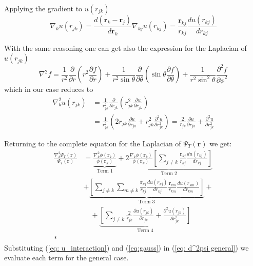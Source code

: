 Applying the gradient to $u(r_{jk})$
\begin{equation*}
    \nabla_k u(r_{jk}) = \frac{ d (\mathbf{r}_k - \mathbf{r}_j)}{d \mathbf{r}_k} \nabla_{kj} u(r_{kj}) = \frac{\mathbf{r}_{kj}}{r_{kj}} \frac{du(r_{kj})}{dr_{kj}}
\end{equation*}

With the same reasoning one can get also the expression for the Laplacian of $u(r_{jk})$
\begin{equation*}
    \nabla^2 f = \frac{1}{r^2} \frac{\partial}{\partial r} \left( r^2 \frac{\partial f}{\partial r} \right) + \frac{1}{r^2 \sin\theta } \frac{\partial }{\partial\theta} \left( \sin \theta \frac{\partial f}{\partial \theta} \right) + \frac{1}{r^2 \sin^2 \theta} \frac{\partial^2 f}{\partial \phi^2}
\end{equation*}
which in our case reduces to
\begin{align*}
    \nabla_k^2 u(r_{jk}) &= \frac{1}{r_{jk}^2} \frac{\partial}{\partial r_{jk}} \left( r_{jk}^2 \frac{\partial u}{\partial r_{jk}} \right) \\ &= \frac{1}{r_{jk}^2}  \left( 2 r_{jk} \frac{\partial u}{\partial r_{jk}} + r_{jk}^2 \frac{\partial^2 u}{\partial r_{jk}^2} \right) = \frac{2}{r_{jk}} \frac{\partial u}{\partial r_{jk}} + \frac{\partial^2 u}{\partial r_{jk}^2}
\end{align*}

Returning to the complete equation for the Laplacian of $\Psi_T(\mathbf{r})$ we get:
\begin{align}
     \frac{ \nabla_k^2 \Psi_T(\mathbf{r})}{\Psi_T(\mathbf{r})} &=  \underbrace{\frac{\nabla_k^2 \phi(\mathbf{r}_k)}{\phi(\mathbf{r}_k)}}_{\text{Term 1}} 
     + \underbrace{2 \frac{\nabla_k \phi(\mathbf{r}_k)}{\phi(\mathbf{r}_k)} \left[ \sum_{j\neq k}  \frac{\mathbf{r}_{kj}}{r_{kj}} \frac{du(r_{kj})}{dr_{kj}} \right]}_{\text{Term 2}} \nonumber\\
     &+ \underbrace{\left[ \sum_{j\neq k} \sum_{m \neq k} \frac{\mathbf{r}_{kj}}{r_{kj}} \frac{du(r_{kj})}{dr_{kj}} \frac{\mathbf{r}_{km}}{r_{km}} \frac{du(r_{km})}{dr_{km}} \right]}_{\text{Term 3}} + \nonumber\\
     &\quad + \underbrace{\left[ \sum_{j\neq k} \frac{2}{r_{jk}} \frac{\partial u(r_{jk})}{\partial r_{jk}} + \frac{\partial^2 u(r_{jk})}{\partial r_{jk}^2} \right]}_{\text{Term 4}} \nonumber\\*
     \label{eq: d^2psi general}
\end{align}
Substituting (\ref{eq: u_interaction}) and (\ref{eq:gauss}) in (\ref{eq: d^2psi general}) we evaluate each term for the general case. 

